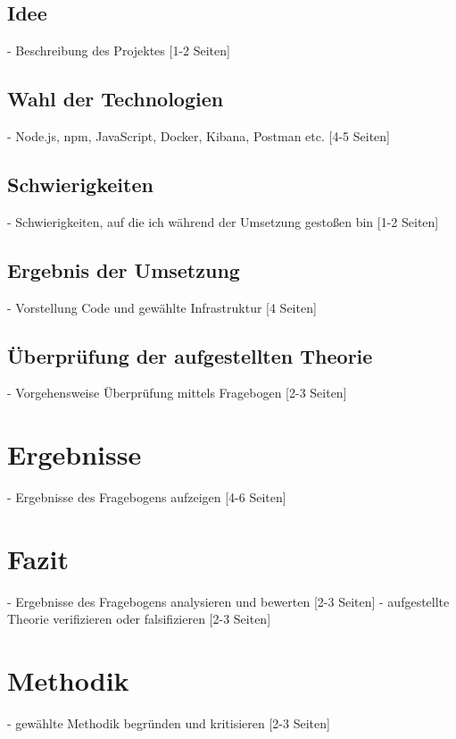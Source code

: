 \subsection{Idee}
    - Beschreibung des Projektes [1-2 Seiten]

\subsection{Wahl der Technologien}
    - Node.js, npm, JavaScript, Docker, Kibana, Postman etc. [4-5 Seiten]

\subsection{Schwierigkeiten}
    - Schwierigkeiten, auf die ich während der Umsetzung gestoßen bin [1-2 Seiten]
    
\subsection{Ergebnis der Umsetzung}
    - Vorstellung Code und gewählte Infrastruktur [4 Seiten]

\subsection{Überprüfung der aufgestellten Theorie}
    - Vorgehensweise Überprüfung mittels Fragebogen [2-3 Seiten]

\section{Ergebnisse}
    - Ergebnisse des Fragebogens aufzeigen [4-6 Seiten]

\section{Fazit}
    - Ergebnisse des Fragebogens analysieren und bewerten [2-3 Seiten]
    - aufgestellte Theorie verifizieren oder falsifizieren [2-3 Seiten]

\section{Methodik}
    - gewählte Methodik begründen und kritisieren [2-3 Seiten]
    
